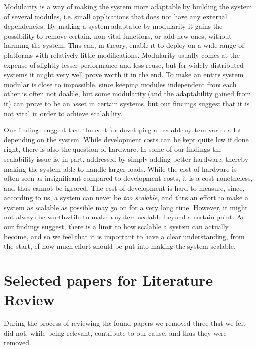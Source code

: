 \documentclass{article}
\begin{document}
{Modularity is a way of making the system more adaptable by building the system
of several modules, i.e. small applications that does not have any external
dependencies\cite{lipson2007principles}. By making a system adaptable by
modularity it gains the possibility to remove certain, non-vital functions, or
add new ones, without harming the system. This can, in theory, enable it to
deploy on a wide range of platforms with relatively little modifications.
Modularity usually comes at the expense of slightly lesser performance and less
reuse, but for widely distributed systems it might very well prove worth it in
the end. To make an entire system modular is close to impossible, since keeping
modules independent from each other is often not doable, but some modularity
(and the adaptability gained from it) can prove to be an asset in certain
systems, but our findings suggest that it is not vital in order to achieve
scalability.

Our findings suggest that the cost for developing a scalable system varies a
lot depending on the system. While development costs can be kept quite low if
done right, there is also the question of hardware. In some of our findings the
scalability issue is, in part, addressed by simply adding better
hardware\cite{fayad2005towards}\cite{haggander1999guidelines}, thereby making
the system able to handle larger loads. While the cost of hardware is often
seen as insignificant compared to development costs, it is a cost nonetheless,
and thus cannot be ignored.
The cost of development is hard to measure, since, according to us, a system
can never be \emph{too scalable}, and thus an effort to make a system as
scalable as possible may go on for a very long time. However, it might not
always be worthwhile to make a system scalable beyond a certain point. As our
findings suggest, there is a limit to how scalable a system can actually
become\cite{amdahl1967validity}, and so we feel that it is important to have a
clear understanding, from the start, of how much effort should be put into
making the system scalable.




\newpage
 
\appendix
\section{Selected papers for Literature Review}
During the process of reviewing the found papers we removed three that we felt
did not, while being relevant, contribute to our cause, and thus they were
removed. 

}
\end{document}
